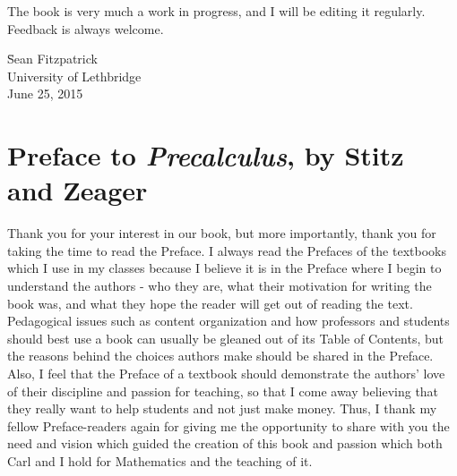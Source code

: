 The book is very much a work in progress, and I will be editing it regularly. Feedback is always welcome. 

\vspace{.5in}

\begin{tabbing}

\hspace{4in}   \= Sean Fitzpatrick \\
               \> University of Lethbridge \\
               \> June 25, 2015
\end{tabbing}

\newpage

\section*{Preface to \textit{Precalculus}, by Stitz and Zeager}

\noindent Thank you for your interest in our book, but more importantly, thank you for taking the time to read the Preface.  I always read the Prefaces of the textbooks which I use in my classes because I believe it is in the Preface where I begin to understand the authors - who they are, what their motivation for writing the book was, and what they hope the reader will get out of reading the text.  Pedagogical issues such as content organization and how professors and students should best use a book can usually be gleaned out of its Table of Contents, but the reasons behind the choices authors make should be shared in the Preface.  Also, I feel that the Preface of a textbook should demonstrate the authors' love of their discipline and passion for teaching, so that I come away believing that they really want to help students and not just make money. Thus, I thank my fellow Preface-readers again for giving me the opportunity to share with you the need and vision which guided the creation of this book and passion which both Carl and I hold for Mathematics and the teaching of it.

\medskip

